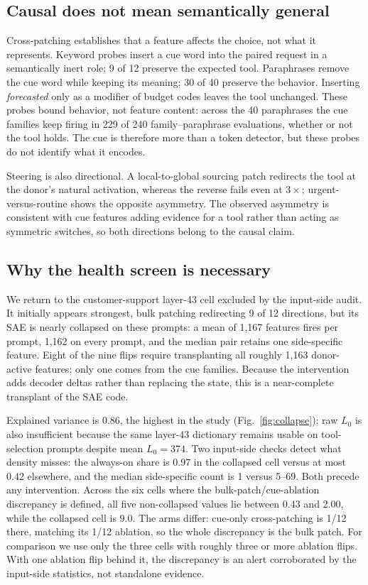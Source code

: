 \documentclass{article}
\begin{document}
\subsection{Causal does not mean semantically general}
\label{sec:semantics}

Cross-patching establishes that a feature affects the choice, not what it
represents. Keyword probes insert a cue word into the paired request in a
semantically inert role; 9 of 12 preserve the expected tool. Paraphrases remove
the cue word while keeping its meaning; 30 of 40 preserve the behavior.
Inserting \emph{forecasted} only as a modifier of budget codes leaves the tool
unchanged. These probes bound behavior, not feature content: across the 40
paraphrases the cue families keep firing in 229 of 240 family--paraphrase
evaluations, whether or not the tool holds. The cue is therefore more than a
token detector, but these probes do not identify what it encodes.

Steering is also directional. A local-to-global sourcing patch redirects the
tool at the donor's natural activation, whereas the reverse fails even at
$3\times$; urgent-versus-routine shows the opposite asymmetry. The observed asymmetry is
consistent with cue features adding evidence for a tool rather than acting as
symmetric switches, so both directions belong to the causal claim.

\subsection{Why the health screen is necessary}
\label{sec:collapse}

We return to the customer-support layer-43 cell excluded by the input-side
audit. It initially appears strongest, bulk patching redirecting 9 of 12
directions, but its SAE is nearly collapsed on these prompts: a mean of 1,167
features fires per prompt, 1,162 on every prompt, and the median pair retains
one side-specific feature. Eight of the nine flips
require transplanting all roughly 1,163 donor-active features; only one comes
from the cue families. Because the intervention adds decoder deltas rather than
replacing the state, this is a near-complete transplant of the SAE code.

Explained variance is 0.86, the highest in the study
(Fig.~\ref{fig:collapse}); raw $L_0$ is also insufficient because the same
layer-43 dictionary remains usable on tool-selection prompts despite mean
$L_0=374$. Two input-side checks detect what density misses: the always-on
share is 0.97 in the collapsed cell versus at most 0.42 elsewhere, and the
median side-specific count is 1 versus 5--69. Both precede any intervention. Across the six cells where the bulk-patch/cue-ablation
discrepancy is defined, all five non-collapsed values lie between 0.43 and
2.00, while the collapsed cell is 9.0. The arms differ: cue-only cross-patching
is 1/12 there, matching its 1/12 ablation, so the whole discrepancy is the bulk
patch. For comparison we use only the three cells with roughly three or
more ablation flips. With one ablation flip behind it, the discrepancy is an
alert corroborated by the input-side statistics, not standalone evidence.
\end{document}
